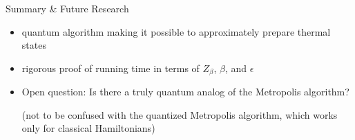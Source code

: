\documentclass[slideColor]{prosper}
\renewcommand{\>}{\rangle}
\newcommand{\<}{\langle}
\begin{document}

\begin{slide}{Summary \& Future Research}

\begin{itemize}
\item quantum algorithm making it possible to approximately prepare thermal states

\medskip
\item rigorous proof of running time in terms of $Z_\beta$, $\beta$, and $\epsilon$

\bigskip
\item Open question: Is there a truly quantum analog of the Metropolis algorithm?

\medskip
(not to be confused with the quantized Metropolis algorithm, which works only for classical Hamiltonians)

\end{itemize}

\end{slide}

\end{document}
